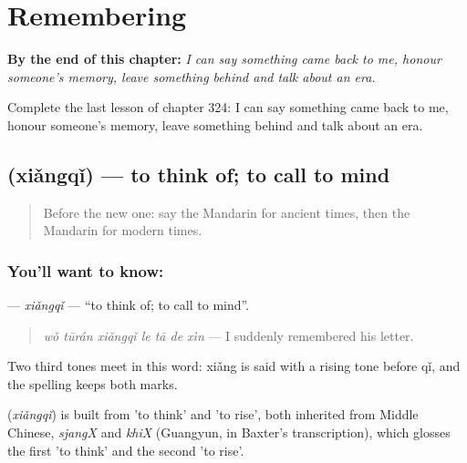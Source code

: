 
\chapter{Remembering}
\label{ch:zh-remembering}

\begin{chapteropening}
\textbf{By the end of this chapter:} \emph{I can say something came back to me, honour someone's memory, leave something behind and talk about an era.}

Complete the last lesson of chapter 324: I can say something came back to me, honour someone's memory, leave something behind and talk about an era.
\end{chapteropening}

\section[\texorpdfstring{\zh{想起} (xiǎngqǐ)}{想起 (xiǎngqǐ)}]{ (xiǎngqǐ) — to think of; to call to mind}

\label{lesson:ZH-C324-xiangqi}



\begin{quote}
Before the new one: say the Mandarin for ancient times, then the Mandarin for modern times.
\end{quote}

\subsection*{You'll want to know: }
\textbf{} — \emph{xiǎngqǐ} — \textquotedblleft{}to think of; to call to mind\textquotedblright{}.

\begin{quote}
\textbf{} \emph{wǒ tūrán xiǎngqǐ le tā de xìn} — I suddenly remembered his letter.
\end{quote}

Two third tones meet in this word: xiǎng is said with a rising tone before qǐ, and the spelling keeps both marks.

\begin{cousinweb}
\textbf{} (\emph{xiǎngqǐ}) is built from  'to think' and  'to rise', both inherited from Middle Chinese, \emph{sjangX} and \emph{khiX} (Guangyun, in Baxter's transcription), which glosses the first 'to think' and the second 'to rise'.
\end{cousinweb}

